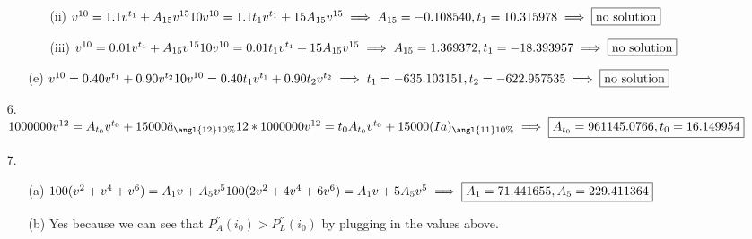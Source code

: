 \documentclass{article}
\begin{document}
\begin{itemize}
\begin{itemize}
\begin{itemize}
			            \item [(ii)] $v^{10}=1.1v^{t_1}+A_{15}v^{15}\\10v^{10}=1.1t_1v^{t_1}+15A_{15}v^{15}\\\implies A_{15}=-0.108540, t_{1}=10.315978 \implies \boxed{\text{no solution}}$
			            \item [(iii)] $v^{10}=0.01v^{t_1}+A_{15}v^{15}\\10v^{10}=0.01t_1v^{t_1}+15A_{15}v^{15}\\\implies A_{15}=1.369372, t_{1}=-18.393957 \implies \boxed{\text{no solution}}$
		            \end{itemize}
		      \item [(e)] $v^{10}=0.40v^{t_1}+0.90v^{t_2}\\10v^{10}=0.40t_1v^{t_1}+0.90t_2v^{t_2}\\\implies t_1=-635.103151, t_2=-622.957535 \implies \boxed{\text{no solution}}$
	      \end{itemize}
	\item [6.] $1000000v^{12}=A_{t_0}v^{t_0}+15000\ddot{a}_{\angl{12}10\%}\\12*1000000v^{12}=t_0A_{t_0}v^{t_0}+15000(Ia)_{\angl{11}10\%}\\\implies \boxed{A_{t_0}=961145.0766, t_0=16.149954}$
	\item [7.] \begin{itemize}
		      \item [(a)] $100(v^2+v^4+v^6)=A_1v+A_5v^5\\100(2v^2+4v^4+6v^6)=A_1v+5A_5v^5\\\implies \boxed{A_1=71.441655, A_5=229.411364}$
		      \item [(b)] Yes because we can see that $P_A^{''}(i_0)>P_L^{''}(i_0)$ by plugging in the values above.
	      \end{itemize}
\end{itemize}
\end{document}
